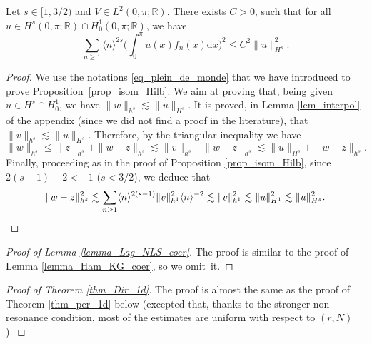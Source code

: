 \begin{lemma}
\label{lem_inter_fn}
Let $s \in [1,3/2)$ and $V\in L^2(0,\pi;\mathbb{R})$. There exists $C>0$, such that for all $u\in H^{s}(0,\pi;\mathbb{R}) \cap H^1_0(0,\pi;\mathbb{R})$, we have
\[
\sum_{n\geq 1} \langle n \rangle^{2s} \biggl(\int_0^\pi u(x) f_n(x) \mathrm{d}x \biggr)^2 \leq C^2 \|u\|_{H^{s}}^2.
\]
\end{lemma}
\begin{proof} We use the notations \eqref{eq_plein_de_monde} that we have introduced to prove Proposition~\ref{prop_isom_Hilb}.
We aim at proving that, being given $u\in H^{s} \cap H^1_0$, we have $\| w\|_{h^{s}} \lesssim \| u \|_{H^s}$. It is proved, in Lemma \ref{lem_interpol} of the appendix (since we did not find a proof in the literature), that
$\| v \|_{h^s} \lesssim \| u\|_{H^s}$. Therefore, by the triangular inequality we have
\[
\| w\|_{h^{s}} \leq \| z \|_{h^{s}} + \|w - z \|_{h^{s}} \lesssim \| v \|_{h^{s}}+ \|w - z \|_{h^{s}} \lesssim \| u \|_{H^s} + \|w - z \|_{h^{s}}.
\]
Finally, proceeding as in the proof of Proposition \ref{prop_isom_Hilb}, since $2(s-1)-2<-1$ (\ie $s<3/2$), we deduce that
\[
\|w - z \|_{h^{s}}^2 \lesssim \sum_{n\geq 1} \langle n \rangle^{2(s-1)} \| v\|_{h^1}^2 \langle n \rangle^{-2} \lesssim \| v\|_{h^1}^2 \lesssim \| u\|_{H^1}^2 \lesssim \| u\|_{H^s}^2.\qedhere
\]
\end{proof}


\begin{proof}[Proof of Lemma \ref{lemma_Lag_NLS_coer}] The proof is similar to the proof of Lemma \ref{lemma_Ham_KG_coer}, so we omit~it.
\end{proof}

\begin{proof}[Proof of Theorem \ref{thm_Dir_1d}] The proof is almost the same as the proof of Theorem \ref{thm_per_1d} below (excepted that, thanks to the stronger non-resonance condition, most of the estimates are uniform with respect to $(r,N)$).
\end{proof}

